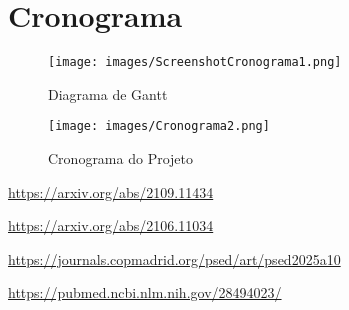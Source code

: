 \documentclass[a4paper,12pt]{article}
\begin{document}
\section{Cronograma}
\begin{figure}[H]
    \centering
    \texttt{[image: images/ScreenshotCronograma1.png]} %
    \caption{Diagrama de Gantt}
    \label{fig:cronograma_gantt}
\end{figure}

\vspace{1em}

\begin{figure}[H]
    \centering
    \texttt{[image: images/Cronograma2.png]} %
    \caption{Cronograma do Projeto}
    \label{fig:cronograma_projeto}
\end{figure}

\vspace{1em}

\begin{thebibliography}{9}
 \href{https://arxiv.org/abs/2109.11434}{https://arxiv.org/abs/2109.11434}

 \href{https://arxiv.org/abs/2106.11034}{https://arxiv.org/abs/2106.11034}

 \href{https://journals.copmadrid.org/psed/art/psed2025a10}{https://journals.copmadrid.org/psed/art/psed2025a10}

 \href{https://pubmed.ncbi.nlm.nih.gov/28494023/}{https://pubmed.ncbi.nlm.nih.gov/28494023/}
\end{thebibliography}
\end{document}
